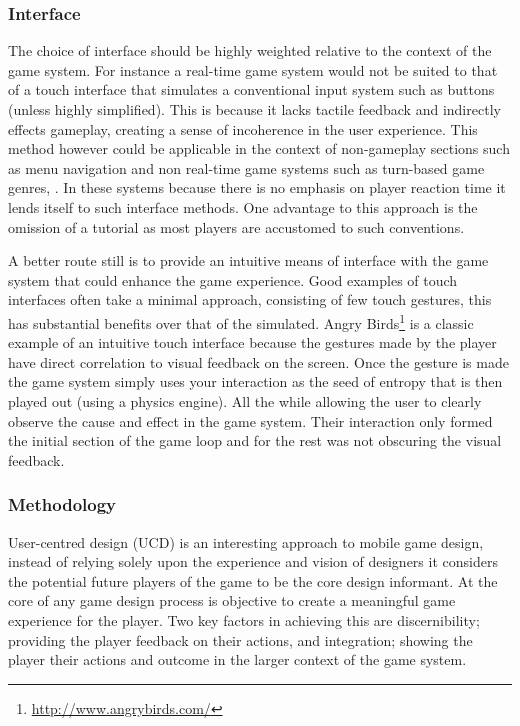\documentclass[final]{cmpreport}
\begin{document}
\subsubsection{Interface}
The choice of interface should be highly weighted relative to the context of the game system. For instance a real-time game system would not be suited to that of a touch interface that simulates a conventional input system such as buttons (unless highly simplified). This is because it lacks tactile feedback and indirectly effects gameplay, creating a sense of incoherence in the user experience. This method however could be applicable in the context of non-gameplay sections such as menu navigation and non real-time game systems such as turn-based game genres, \cite{XuBradburn}. In these systems because there is no emphasis on player reaction time it lends itself to such interface methods. One advantage to this approach is the omission of a tutorial as most players are accustomed to such conventions.

A better route still is to provide an intuitive means of interface with the game system that could enhance the game experience. Good examples of touch interfaces often take a minimal approach, consisting of few touch gestures, this has substantial benefits over that of the simulated. Angry Birds\footnote{\url{http://www.angrybirds.com/}} is a classic example of an intuitive touch interface because the gestures made by the player have direct correlation to visual feedback on the screen. Once the gesture is made the game system simply uses your interaction as the seed of entropy that is then played out (using a physics engine). All the while allowing the user to clearly observe the cause and effect in the game system. Their interaction only formed the initial section of the game loop and for the rest was not obscuring the visual feedback.

\subsubsection{Methodology}
User-centred design (UCD) is an interesting approach to mobile game design, instead of relying solely upon the experience and vision of designers it considers the potential future players of the game to be the core design informant. At the core of any game design process is objective to create a meaningful game experience for the player. Two key factors in achieving this are discernibility; providing the player feedback on their actions, and integration; showing the player their actions and outcome in the larger context of the game system.
\end{document}
